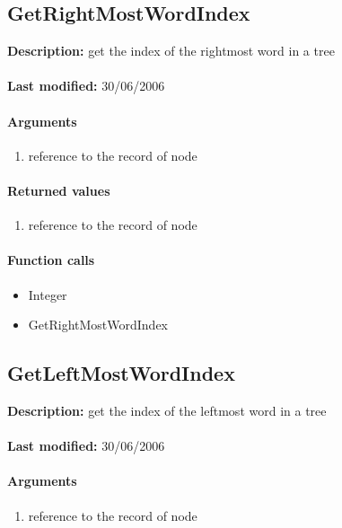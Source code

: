 \subsection{GetRightMostWordIndex}
\textbf{Description:} get the index of the rightmost word in a tree\\
\\\textbf{Last modified:} 30/06/2006

\paragraph{Arguments}
\begin{enumerate}
\item reference to the record of node
\end{enumerate}

\paragraph{Returned values}
\begin{enumerate}
\item reference to the record of node
\end{enumerate}

\paragraph{Function calls}
\begin{itemize}
\item Integer
\item GetRightMostWordIndex
\end{itemize}

\subsection{GetLeftMostWordIndex}
\textbf{Description:} get the index of the leftmost word in a tree\\
\\\textbf{Last modified:} 30/06/2006

\paragraph{Arguments}
\begin{enumerate}
\item reference to the record of node
\end{enumerate}

